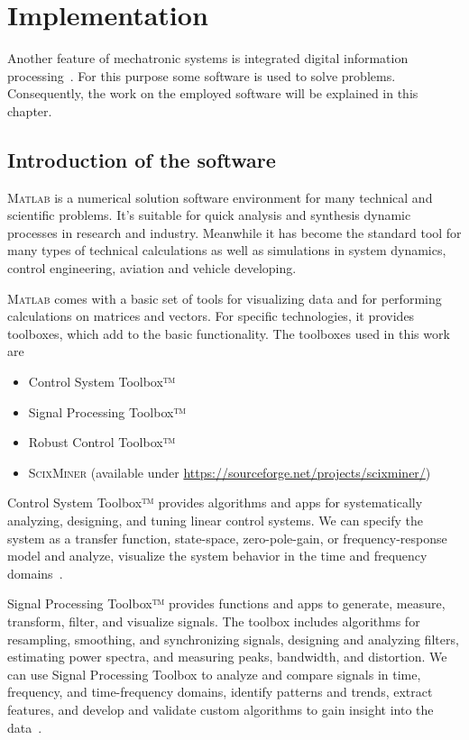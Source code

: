 \chapter{Implementation}

Another feature of mechatronic systems is integrated digital information processing~\cite{isermann2007mechatronische}.
%
For this purpose some software is used to solve problems.
%
Consequently, the work on the employed software will be explained in this chapter.

\section{Introduction of the software}

\textsc{Matlab} is a numerical solution software environment for many technical and scientific problems.
%
It's suitable for quick analysis and synthesis dynamic processes in research and industry.
%
Meanwhile it has become the standard tool for many types of technical calculations as well as simulations in system dynamics, control engineering, aviation and vehicle developing.
%

\textsc{Matlab} comes with a basic set of tools for visualizing data and for performing calculations on matrices and vectors.
%
For specific technologies, it provides toolboxes, which add to the basic functionality.
%
The toolboxes used in this work are

\begin{itemize}
\item Control System Toolbox™
\item Signal Processing Toolbox™
\item Robust Control Toolbox™ 
\item \textsc{ScixMiner} (available under \url{https://sourceforge.net/projects/scixminer/})
\end{itemize}

Control System Toolbox™ provides algorithms and apps for systematically analyzing, designing, and tuning linear control systems.
%
We can specify the system as a transfer function, state-space, zero-pole-gain, or frequency-response model and analyze, visualize the system behavior in the time and frequency domains~\cite{Mathworks_cst}.

Signal Processing Toolbox™ provides functions and apps to generate, measure, transform, filter, and visualize signals.
%
The toolbox includes algorithms for resampling, smoothing, and synchronizing signals, designing and analyzing filters, estimating power spectra, and measuring peaks, bandwidth, and distortion.
%
We can use Signal Processing Toolbox to analyze and compare signals in time, frequency, and time-frequency domains, identify patterns and trends, extract features, and develop and validate custom algorithms to gain insight into the data~\cite{Mathworks_spt}.

